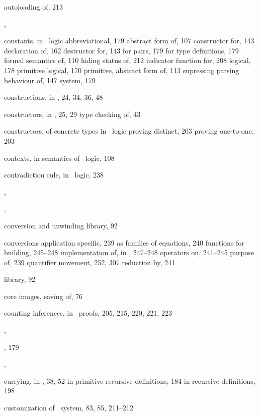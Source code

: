 \begin{theindex}
    \subitem autoloading of, 213
  \item {}, 
  \item constants, in \HOL\ logic
    \subitem abbreviational, 179
    \subitem abstract form of, 107
    \subitem constructor for, 143
    \subitem declaration of, 162
    \subitem destructor for, 143
    \subitem for pairs, 179
    \subitem for type definitions, 179
    \subitem formal semantics of, 110
    \subitem hiding status of, 212
    \subitem indicator function for, 208
    \subitem logical, 178
    \subitem primitive logical, 170
    \subitem primitive, abstract form of, 113
    \subitem supressing parsing behaviour of, 147
    \subitem system, 179
  \item constructions, in \ML, 24, 34, 36, 48
  \item constructors, in \ML, 25, 29
    \subitem type checking of, 43
  \item constructors, of concrete types in \HOL\ logic
    \subitem proving distinct, 203
    \subitem proving one-to-one, 203
  \item contexts, in semantics of \HOL\ logic, 108
  \item contradiction rule, in \HOL\ logic, 238
  \item {}, 
  \item {}, 
  \item conversion and unwinding library, 92
  \item conversions
    \subitem application specific, 239
    \subitem as families of equations, 240
    \subitem functions for building, 245--248
    \subitem implementation of, in \ML, 247--248
    \subitem operators on, 241--245
    \subitem purpose of, 239
    \subitem quantifier movement, 252, 307
    \subitem reduction by, 241
  \item {} library, 92
  \item core images, saving of, 76
  \item counting inferences, in \HOL\ proofs, 205, 215, 220, 221, 223
  \item {}, 
  \item {}, 179
  \item {}, 
  \item currying, in \ML, 38, 52
    \subitem in primitive recursive definitions, 184
    \subitem in recursive definitions, 198
  \item customization of \HOL\ system, 83, 85, 211--212


\end{theindex}
